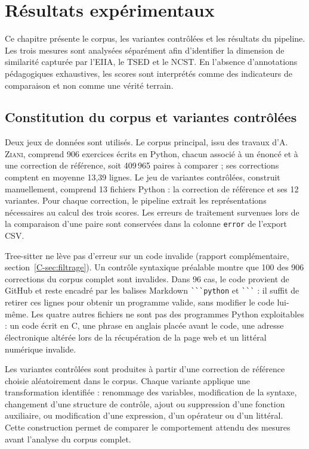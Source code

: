 \documentclass[12pt,a4paper,oneside]{report}
\begin{document}

\chapter{Résultats expérimentaux}
\label{chap:resultats}

Ce chapitre présente le corpus, les variantes contrôlées et les résultats du
pipeline. Les trois mesures sont analysées séparément afin d'identifier la
dimension de similarité capturée par l'EIIA, le TSED et le NCST. En l'absence
d'annotations pédagogiques exhaustives, les scores sont interprétés comme des
indicateurs de comparaison et non comme une vérité terrain.

\section{Constitution du corpus et variantes contrôlées}

Deux jeux de données sont utilisés. Le corpus principal, issu des travaux
d'A. \textsc{Ziani}, comprend 906 exercices écrits en Python, chacun associé
à un énoncé et à une correction de référence, soit 409\,965 paires à
comparer ; ses corrections comptent en moyenne 13,39 lignes. Le jeu de
variantes contrôlées, construit manuellement, comprend 13 fichiers Python :
la correction de référence et ses 12 variantes.
Pour chaque correction, le pipeline extrait les représentations nécessaires au
calcul des trois scores. Les erreurs de traitement survenues lors de la
comparaison d'une paire sont conservées dans la colonne \texttt{error} de
l'export CSV.

Tree-sitter ne lève pas d'erreur sur un code invalide
(rapport complémentaire, section~\ref{C-sec:filtrage}). Un contrôle syntaxique préalable montre que
100 des 906 corrections du corpus complet sont invalides. Dans 96 cas, le
code provient de GitHub et reste encadré par les balises Markdown
\verb|```python| et \verb|```| : il suffit de retirer ces lignes pour
obtenir un programme valide, sans modifier le code lui-même. Les quatre
autres fichiers ne sont pas des programmes Python exploitables : un code
écrit en C, une phrase en anglais placée avant le code, une adresse
électronique altérée lors de la récupération de la page web et un littéral
numérique invalide.

Les variantes contrôlées sont produites à partir d'une correction de
référence choisie aléatoirement dans le corpus.
Chaque variante applique une transformation identifiée : renommage des
variables, modification de la syntaxe, changement d'une structure de contrôle,
ajout ou suppression d'une fonction auxiliaire, ou modification d'une
expression, d'un opérateur ou d'un littéral. Cette construction permet de
comparer le comportement attendu des mesures avant l'analyse du corpus complet.
\end{document}
